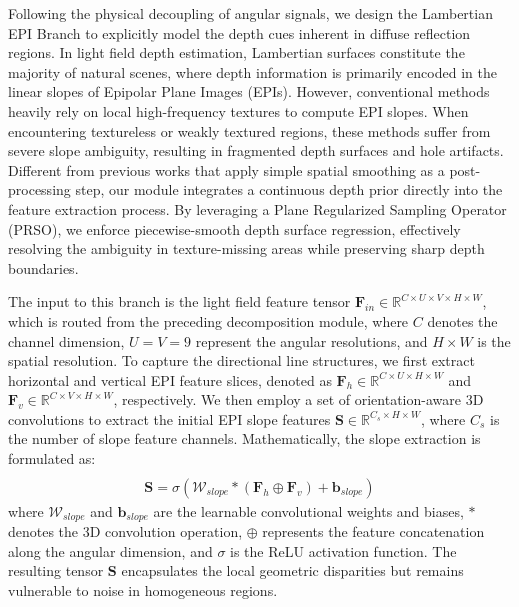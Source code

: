 \documentclass[lettersize,journal]{IEEEtran}
\begin{document}
Following the physical decoupling of angular signals, we design the Lambertian EPI Branch to explicitly model the depth cues inherent in diffuse reflection regions. In light field depth estimation, Lambertian surfaces constitute the majority of natural scenes, where depth information is primarily encoded in the linear slopes of Epipolar Plane Images (EPIs). However, conventional methods heavily rely on local high-frequency textures to compute EPI slopes. When encountering textureless or weakly textured regions, these methods suffer from severe slope ambiguity, resulting in fragmented depth surfaces and hole artifacts. Different from previous works that apply simple spatial smoothing as a post-processing step, our module integrates a continuous depth prior directly into the feature extraction process. By leveraging a Plane Regularized Sampling Operator (PRSO), we enforce piecewise-smooth depth surface regression, effectively resolving the ambiguity in texture-missing areas while preserving sharp depth boundaries.

The input to this branch is the light field feature tensor $\mathbf{F}_{in} \in \mathbb{R}^{C \times U \times V \times H \times W}$, which is routed from the preceding decomposition module, where $C$ denotes the channel dimension, $U=V=9$ represent the angular resolutions, and $H \times W$ is the spatial resolution. To capture the directional line structures, we first extract horizontal and vertical EPI feature slices, denoted as $\mathbf{F}_{h} \in \mathbb{R}^{C \times U \times H \times W}$ and $\mathbf{F}_{v} \in \mathbb{R}^{C \times V \times H \times W}$, respectively. We then employ a set of orientation-aware 3D convolutions to extract the initial EPI slope features $\mathbf{S} \in \mathbb{R}^{C_s \times H \times W}$, where $C_s$ is the number of slope feature channels. Mathematically, the slope extraction is formulated as:
\begin{multline}
 \\
\mathbf{S} = \sigma \left( \mathcal{W}_{slope} * (\mathbf{F}_{h} \oplus \mathbf{F}_{v}) + \mathbf{b}_{slope} \right)
\label{eq:ch3_8}
\end{multline}
where $\mathcal{W}_{slope}$ and $\mathbf{b}_{slope}$ are the learnable convolutional weights and biases, $*$ denotes the 3D convolution operation, $\oplus$ represents the feature concatenation along the angular dimension, and $\sigma$ is the ReLU activation function. The resulting tensor $\mathbf{S}$ encapsulates the local geometric disparities but remains vulnerable to noise in homogeneous regions.
\end{document}
